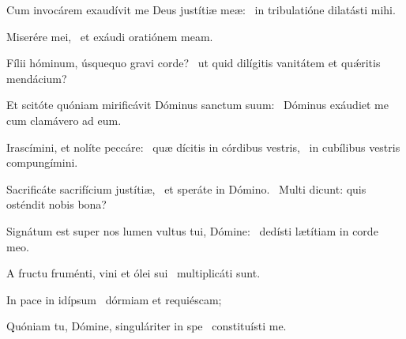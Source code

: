 \item Cum invocárem exaudívit me Deus justítiæ meæ:~\psstar{} in tribulatióne dilatásti mihi.

\item Miserére mei,~\psstar{} et exáudi oratiónem meam.

\item Fílii hóminum, úsquequo gravi corde?~\psstar{} ut quid dilígitis vanitátem et quǽritis mendácium?

\item Et scitóte quóniam mirificávit Dóminus sanctum suum:~\psstar{} Dóminus exáudiet me cum clamávero ad eum.

\item Irascímini, et nolíte peccáre:~\pscross{} quæ dícitis in córdibus vestris,~\psstar{} in cubílibus vestris compungímini.

\item Sacrificáte sacrifícium justítiæ,~\pscross{} et speráte in Dómino.~\psstar{} Multi dicunt: quis osténdit nobis bona?

\item Signátum est super nos lumen vultus tui, Dómine:~\psstar{} dedísti lætítiam in corde meo.

\item A fructu fruménti, vini et ólei sui~\psstar{} multiplicáti sunt.

\item In pace in idípsum~\psstar{} dórmiam et requiéscam;

\item Quóniam tu, Dómine, singuláriter in spe~\psstar{} constituísti me.
